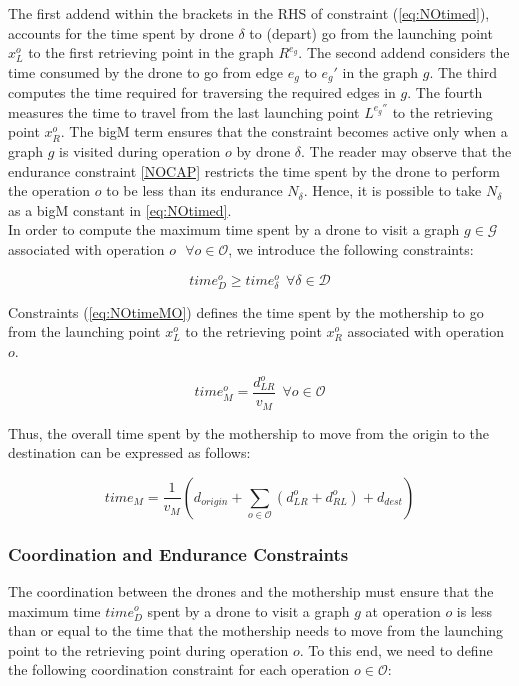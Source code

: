 \documentclass[10pt,a4paper]{elsarticle}
\begin{document}
			\noindent
			The first addend within the brackets in the RHS of constraint (\ref{eq:NOtimed}), accounts for the time spent by drone $\delta$ to (depart) go from the launching point $x_L^o$ to the first retrieving point in the graph $R^{e_g}$. The second addend considers the time consumed by the drone to go from edge $e_g$ to $e_g'$ in the graph $g$. The third computes the time required for traversing the required edges in $g$. The fourth measures the time to travel from the last launching point $L^{e_g''}$ to the retrieving point $x_R^o$.
			The bigM term ensures that the constraint becomes active only when a graph $g$ is visited during operation $o$ by drone $\delta$. The reader may observe that the endurance constraint \eqref{NOCAP} restricts the time spent by the drone to perform the operation $o$ to be less than its endurance $N_\delta$. Hence, it is possible to take $N_\delta$ as a bigM constant in \eqref{eq:NOtimed}.\\
			
			
			\noindent
			In order to compute the maximum time spent by a drone to visit a graph $g \in \mathcal G$ associated with operation $o \:\:\ \forall o \in \mathcal O$, we introduce the following constraints:
			
			\begin{equation}
				time_D^o \geq time_\delta^o \:\: \forall \delta \in \mathcal D
				\label{eq:NOtimeD}
			\end{equation}
			
			\noindent
			Constraints (\ref{eq:NOtimeMO}) defines the time spent by the mothership to go from the launching point $x_L^o$ to the retrieving point $x_R^o$ associated with operation $o$. 
			
			\begin{equation}
				time_M^o = \frac{d_{LR}^o}{v_M} \:\: \forall o \in \mathcal O
				\label{eq:NOtimeMO}
			\end{equation}
			
			\noindent
			Thus, the overall time spent by the mothership to move from the origin to the destination can be expressed as follows:
			
			\begin{equation}
				time_M = \frac{1}{v_M} (d_{origin} + \sum_{o \in \mathcal O} (d_{LR}^o + d_{RL}^o) + d_{dest})
				\label{eq:NOtimeM}
			\end{equation}
			
			
			\subsubsection*{Coordination and Endurance Constraints}
			\noindent
			The coordination between the drones and the mothership must ensure that the maximum time $time_D^o$ spent by a drone to visit a graph $g$ at operation $o$ is less than or equal to the time that the mothership needs to move from the launching point to the retrieving point during operation $o$. To this end, we need to define the following coordination constraint for each operation $o\in \mathcal O$:
			
\end{document}
